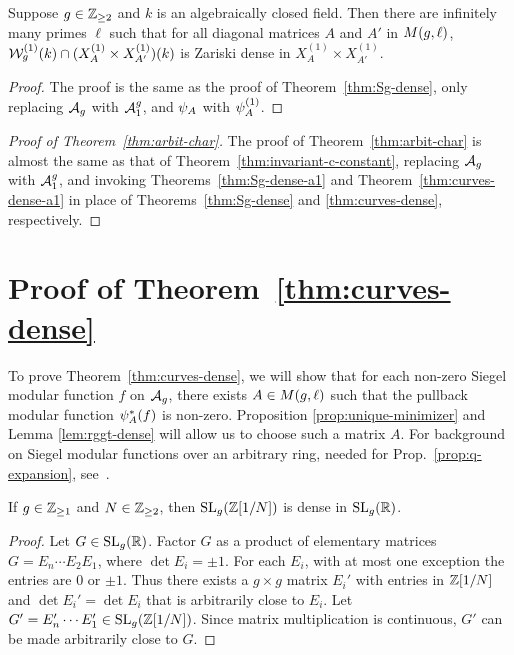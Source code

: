 \documentclass{amsart}
\begin{document}
\begin{theorem}\label{thm:Sg-dense-a1}
  Suppose $g\in\mathbb{Z}_{\ge 2}$ and $k$ is an algebraically closed field. Then there are infinitely many primes $\ell$ such that for all diagonal matrices $A$ and $A'$ in $M(g,\ell)$, $\mathcal{W}_g^{(1)}(k) \cap (X^{(1)}_A \times X^{(1)}_{A'})(k)$ is Zariski dense in $X^{(1)}_A \times X^{(1)}_{A'}$.
\end{theorem}

\begin{proof}
  The proof is the same as the proof of Theorem~\ref{thm:Sg-dense}, only replacing $\mathcal{A}_g$ with $\mathcal{A}_1^g$, and $\psi_{A}$ with $\psi_{A}^{(1)}$.
\end{proof}

\begin{proof}[Proof of Theorem~\ref{thm:arbit-char}]
  The proof of Theorem~\ref{thm:arbit-char} is almost the same as that of Theorem~\ref{thm:invariant-c-constant}, replacing $\mathcal{A}_g$  with $\mathcal{A}_1^g$, and invoking Theorems~\ref{thm:Sg-dense-a1} and  Theorem~\ref{thm:curves-dense-a1} in place of Theorems~\ref{thm:Sg-dense} and \ref{thm:curves-dense}, respectively.
\end{proof}








\section{Proof of Theorem~\ref{thm:curves-dense}}
\label{sec:step-1}

To prove Theorem~\ref{thm:curves-dense}, we will show that for each non-zero Siegel modular function $f$ on $\mathcal{A}_g$, there exists $A \in M(g,\ell)$ such that the pullback modular function $\psi_{A}^*(f)$ is non-zero.
Proposition \ref{prop:unique-minimizer} and Lemma \ref{lem:rggt-dense} will allow us to choose such a matrix $A$. For background on Siegel modular functions over an arbitrary ring, needed for Prop.~\ref{prop:q-expansion}, see~\cite[\S{}V.1]{faltings1990degeneration}.


\begin{lemma}\label{lem:sl-dense}
  If $g\in\mathbb{Z}_{\ge 1}$ and $N\in\mathbb{Z}_{\ge 2}$, then $\operatorname{SL}_g(\mathbb{Z}[1/N])$ is dense in $\operatorname{SL}_g(\mathbb{R})$.
\end{lemma}
\begin{proof}
  Let $G \in \operatorname{SL}_g(\mathbb{R})$. Factor $G$ as a product of elementary matrices $G = E_n \cdots E_2 E_1$, where $\det E_i = \pm 1$. For each $E_i$, with at most one exception the entries are $0$ or $\pm 1$. Thus there exists a $g \times g$ matrix $E_i'$ with entries in $\mathbb{Z}[1/N]$ and $\det E_i' = \det E_i$ that is arbitrarily close to $E_i$. Let $G' = E_n' \cdots E_1' \in \operatorname{SL}_g(\mathbb{Z}[1/N])$. Since matrix multiplication is continuous, $G'$ can be made arbitrarily close to $G$.
\end{proof}
\end{document}
